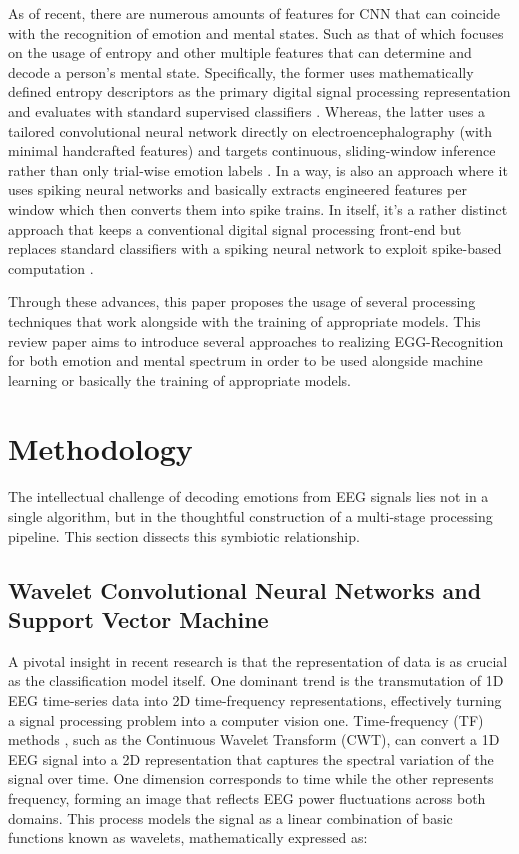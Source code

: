 \documentclass[conference]{IEEEtran}
\begin{document}
 As of recent, there are numerous amounts of features for CNN that can coincide with the recognition of emotion and mental states. Such as that of \cite{Patel2021EEGEntropyReview, Lee2020MFB_CNN_PilotMentalStates} which focuses on the usage of entropy and other multiple features that can determine and decode a person's mental state. Specifically, the former \cite{Patel2021EEGEntropyReview} uses mathematically defined entropy descriptors as the primary digital signal processing representation and evaluates with standard supervised classifiers \cite{Hamzah2024HeliyonEEGERSurvey,Chen2025AdvancesEEGEmotion_ASOC}. Whereas, the latter \cite{Lee2020MFB_CNN_PilotMentalStates} uses a tailored convolutional neural network directly on electroencephalography (with minimal handcrafted features) and targets continuous, sliding-window inference rather than only trial-wise emotion labels \cite{Hag2021StressHybridFS_Sensors}.
 In a way, \cite{Luo2020SNN_EEGEmotion} is also an approach where it uses spiking neural networks and basically extracts engineered features per window which then converts them into spike trains. In itself, it's a rather distinct approach that keeps a conventional digital signal processing front-end but replaces standard classifiers with a spiking neural network to exploit spike-based computation \cite{Wang2023DL_EEG_Review}.

 Through these advances, this paper proposes the usage of several processing techniques that work alongside with the training of appropriate models. This review paper aims to introduce several approaches to realizing EGG-Recognition for both emotion and mental spectrum in order to be used alongside machine learning or basically the training of appropriate models.
\section{Methodology}
The intellectual challenge of decoding emotions from EEG signals lies not in a single algorithm, but in the thoughtful construction of a multi-stage processing pipeline. This section dissects this symbiotic relationship.

\subsection{Wavelet Convolutional Neural Networks and Support Vector Machine}
A pivotal insight in recent research is that the representation of data is as crucial as the classification model itself. One dominant trend is the transmutation of 1D EEG time-series data into 2D time-frequency representations, effectively turning a signal processing problem into a computer vision one. Time-frequency (TF) methods \cite{Pachori2023TimeFrequencyBook}, such as the Continuous Wavelet Transform (CWT), can convert a 1D EEG signal into a 2D representation that captures the spectral variation of the signal over time. One dimension corresponds to time while the other represents frequency, forming an image that reflects EEG power fluctuations across both domains. This process models the signal as a linear combination of basic functions known as wavelets, mathematically expressed as:
\end{document}
